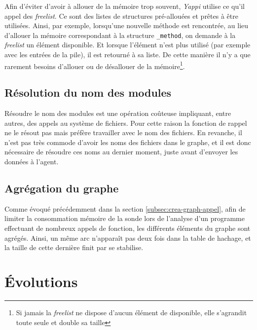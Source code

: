 \begin{note}[freelist]
Afin d'éviter d'avoir à allouer de la mémoire trop souvent, \emph{Yappi} utilise ce qu'il appel des \emph{freelist}. Ce sont des listes de structures pré-allouées et prêtes à être utilisées. Ainsi, par exemple, lorsqu'une nouvelle méthode est rencontrée, au lieu d'allouer la mémoire correspondant à la structure \verb|_method|, on demande à la \emph{freelist} un élément disponible. Et lorsque l'élément n'est plus utilisé (par exemple avec les entrées de la pile), il est retourné à sa liste. De cette manière il n'y a que rarement besoins d'allouer ou de désallouer de la mémoire\footnote{Si jamais la \emph{freelist} ne dispose d'aucun élément de disponible, elle s'agrandit toute seule et double sa taille}.
\end{note}

\subsection{Résolution du nom des modules}
Résoudre le nom des modules est une opération coûteuse impliquant, entre autres, des appels au système de fichiers. Pour cette raison la fonction de rappel ne le résout pas mais préfère travailler avec le nom des fichiers. En revanche, il n'est pas très commode d'avoir les noms des fichiers dans le graphe, et il est donc nécessaire de résoudre ces noms au dernier moment, juste avant d'envoyer les données à l'agent.

\subsection{Agrégation du graphe}
Comme évoqué précédemment dans la section \vref{subsec:crea-graph-appel}, afin de limiter la consommation mémoire de la sonde lors de l'analyse d'un programme effectuant de nombreux appels de fonction, les différents éléments du graphe sont agrégés. Ainsi, un même arc n’apparaît pas deux fois dans la table de hachage, et la taille de cette dernière finit par se stabilise.

  \section{Évolutions}
  	
